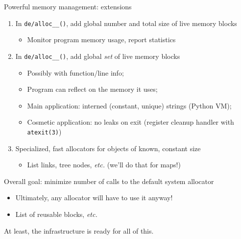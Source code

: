 \begin{frame}[fragile]{Powerful memory management: extensions}

  \begin{enumerate}
  \item In \lstinline{de/alloc__()}, add global number and total size of live memory blocks
    \begin{itemize}
    \item Monitor program memory usage, report statistics
    \end{itemize}
  \item In \lstinline{de/alloc__()}, add global {\em set} of live memory blocks
    \begin{itemize}
    \item Possibly with function/line info;
    \item Program can reflect on the memory it uses;
    \item Main application: interned (constant, unique) strings (Python VM);
    \item Cosmetic application: no leaks on exit (register cleanup handler with \lstinline{atexit(3)})
    \end{itemize}
  \item Specialized, fast allocators for objects of known, constant size
    \begin{itemize}
    \item List links, tree nodes, {\em etc.} (we'll do that for maps!)
    \end{itemize}
  \end{enumerate}
  
  Overall goal: minimize number of calls to the default system allocator
  \begin{itemize}
  \item Ultimately, any allocator will have to use it anyway!
  \item List of reusable blocks, {\em etc.}
  \end{itemize}

  At least, the infrastructure is ready for all of this.

\end{frame}



